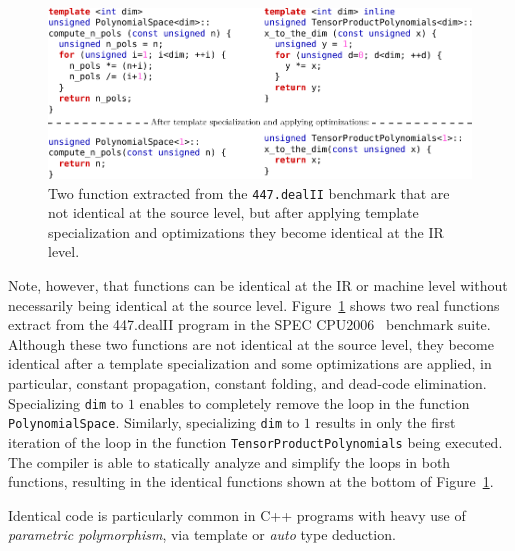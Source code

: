 \begin{figure}[h]
\centering
\includegraphics[scale=0.9]{src/relatedwork/figs/identical-example}
\caption{Two function extracted from the \texttt{447.dealII} benchmark that are not identical at the source level, but after applying template specialization and optimizations they become identical at the IR level.}
\label{fig:identical-example}
\end{figure}

Note, however, that functions can be identical at the IR or machine level without necessarily being identical at the source level.
Figure~\ref{fig:identical-example} shows two real functions extract from the
447.dealII program in the SPEC CPU2006~\cite{spec} benchmark suite.
Although these two functions are not identical at the source level, they become
identical after a template specialization and some optimizations are applied, in
particular, constant propagation, constant folding, and dead-code elimination. 
Specializing \verb|dim| to $1$ enables to completely remove the loop in the
function \verb|PolynomialSpace|.
Similarly, specializing \verb|dim| to $1$ results in only the first iteration
of the loop in the function \verb|TensorProductPolynomials| being executed.
The compiler is able to statically analyze and simplify the loops in both
functions, resulting in the identical functions shown at the bottom of
Figure~\ref{fig:identical-example}.

Identical code is particularly common in C++ programs
with heavy use of \textit{parametric polymorphism}, via template or \textit{auto} type deduction.












